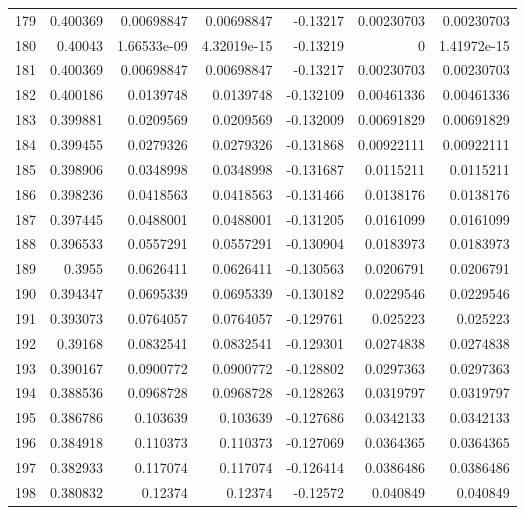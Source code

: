 \begin{tabular}{rrrrrrr}
 179 &  0.400369    & 0.00698847  & 0.00698847  & -0.13217     & 0.00230703  & 0.00230703  \\
 180 &  0.40043     & 1.66533e-09 & 4.32019e-15 & -0.13219     & 0           & 1.41972e-15 \\
 181 &  0.400369    & 0.00698847  & 0.00698847  & -0.13217     & 0.00230703  & 0.00230703  \\
 182 &  0.400186    & 0.0139748   & 0.0139748   & -0.132109    & 0.00461336  & 0.00461336  \\
 183 &  0.399881    & 0.0209569   & 0.0209569   & -0.132009    & 0.00691829  & 0.00691829  \\
 184 &  0.399455    & 0.0279326   & 0.0279326   & -0.131868    & 0.00922111  & 0.00922111  \\
 185 &  0.398906    & 0.0348998   & 0.0348998   & -0.131687    & 0.0115211   & 0.0115211   \\
 186 &  0.398236    & 0.0418563   & 0.0418563   & -0.131466    & 0.0138176   & 0.0138176   \\
 187 &  0.397445    & 0.0488001   & 0.0488001   & -0.131205    & 0.0161099   & 0.0161099   \\
 188 &  0.396533    & 0.0557291   & 0.0557291   & -0.130904    & 0.0183973   & 0.0183973   \\
 189 &  0.3955      & 0.0626411   & 0.0626411   & -0.130563    & 0.0206791   & 0.0206791   \\
 190 &  0.394347    & 0.0695339   & 0.0695339   & -0.130182    & 0.0229546   & 0.0229546   \\
 191 &  0.393073    & 0.0764057   & 0.0764057   & -0.129761    & 0.025223    & 0.025223    \\
 192 &  0.39168     & 0.0832541   & 0.0832541   & -0.129301    & 0.0274838   & 0.0274838   \\
 193 &  0.390167    & 0.0900772   & 0.0900772   & -0.128802    & 0.0297363   & 0.0297363   \\
 194 &  0.388536    & 0.0968728   & 0.0968728   & -0.128263    & 0.0319797   & 0.0319797   \\
 195 &  0.386786    & 0.103639    & 0.103639    & -0.127686    & 0.0342133   & 0.0342133   \\
 196 &  0.384918    & 0.110373    & 0.110373    & -0.127069    & 0.0364365   & 0.0364365   \\
 197 &  0.382933    & 0.117074    & 0.117074    & -0.126414    & 0.0386486   & 0.0386486   \\
 198 &  0.380832    & 0.12374     & 0.12374     & -0.12572     & 0.040849    & 0.040849    \\

\end{tabular}
